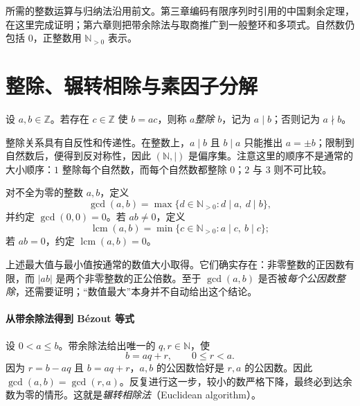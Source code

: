 \documentclass[lang=cn,a4paper,fontset=none,zihao=false,10pt,openany,twoside]{beautybook}
\numberwithin{algorithm}{chapter}
\newcommand{\N}{\mathbb N}
\begin{document}
所需的整数运算与归纳法沿用前文。第三章编码有限序列时引用的中国剩余定理，在这里完成证明；第六章则把带余除法与取商推广到一般整环和多项式。自然数仍包括 $0$，正整数用 $\N_{>0}$ 表示。

\section{整除、辗转相除与素因子分解}\label{sec:integer-factorization}
\begin{definition}[整除]
设 $a,b\in\mathbb Z$。若存在 $c\in\mathbb Z$ 使 $b=ac$，则称 $a$\emph{整除} $b$，记为 $a\mid b$；否则记为 $a\nmid b$。
\end{definition}
整除关系具有自反性和传递性。在整数上，$a\mid b$ 且 $b\mid a$ 只能推出 $a=\pm b$；限制到自然数后，便得到反对称性，因此 $(\N,\mid)$ 是偏序集。注意这里的顺序不是通常的大小顺序：$1$ 整除每个自然数，而每个自然数都整除 $0$；$2$ 与 $3$ 则不可比较。

\begin{definition}[最大公因数与最小公倍数]
对不全为零的整数 $a,b$，定义
\[
 \gcd(a,b)=\max\{d\in\N_{>0}:d\mid a,\ d\mid b\},
\]
并约定 $\gcd(0,0)=0$。若 $ab\ne0$，定义
\[
 \operatorname{lcm}(a,b)=\min\{c\in\N_{>0}:a\mid c,\ b\mid c\};
\]
若 $ab=0$，约定 $\operatorname{lcm}(a,b)=0$。
\end{definition}
上述最大值与最小值按通常的数值大小取得。它们确实存在：非零整数的正因数有限，而 $|ab|$ 是两个非零整数的正公倍数。至于 $\gcd(a,b)$ 是否被\emph{每个公因数整除}，还需要证明；“数值最大”本身并不自动给出这个结论。

\paragraph{从带余除法得到 Bézout 等式}
设 $0<a\le b$。带余除法给出唯一的 $q,r\in\N$，使
\[
 b=aq+r,\qquad 0\le r<a.
\]
因为 $r=b-aq$ 且 $b=aq+r$，$a,b$ 的公因数恰好是 $r,a$ 的公因数。因此
$\gcd(a,b)=\gcd(r,a)$。反复进行这一步，较小的数严格下降，最终必到达余数为零的情形。这就是\emph{辗转相除法}（Euclidean algorithm）。
\end{document}
